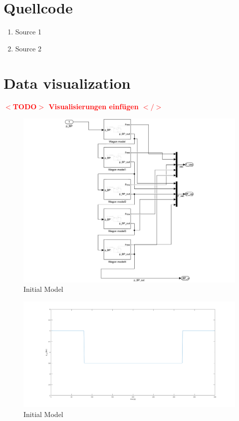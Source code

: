 \documentclass[12pt,a4paper]{book}
\newcommand{\TODO}[1]{\textbf{\textcolor{red}{$<$TODO$>$ #1 $</>$}}}
\begin{document}
\appendix
%
\chapter{Quellcode}
\begin{enumerate}
      \item Source 1
      \item Source 2
\end{enumerate}



\chapter{Data visualization}

%
\TODO{Visualisierungen einfügen}
\begin{figure}[H]
	\centering
	\includegraphics[width=\linewidth]{./pic/initmodel_subsys}
	\caption{Initial Model}
	\label{fig:initmodel_subsys}
\end{figure}

\begin{figure}[H]
	\centering
	\includegraphics[width=\linewidth]{./pic/initmodel_input}
	\caption{Initial Model}
	\label{fig:initmodel_input}
\end{figure}
\end{document}
